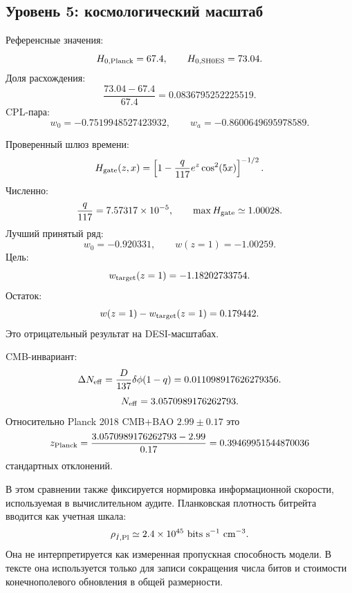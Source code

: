 \documentclass[11pt]{article}
\begin{document}
\subsection{Уровень 5: космологический масштаб}

Референсные значения:
\begin{equation}
    H_{0,\rm Planck}=67.4,
    \qquad
    H_{0,\rm SH0ES}=73.04.
\end{equation}
Доля расхождения:
\begin{equation}
    \frac{73.04-67.4}{67.4}=0.0836795252225519.
\end{equation}
CPL-пара:
\begin{equation}
    w_0=-0.7519948527423932,
    \qquad
    w_a=-0.8600649695978589.
\end{equation}

Проверенный шлюз времени:
\begin{equation}
    H_{\rm gate}(z,x)
    =
    \left[
        1-\frac{q}{117}e^z\cos^2(5x)
    \right]^{-1/2}.
\end{equation}
Численно:
\begin{equation}
    \frac{q}{117}=7.57317\times10^{-5},
    \qquad
    \max H_{\rm gate}\simeq1.00028.
\end{equation}
Лучший принятый ряд:
\begin{equation}
    w_0=-0.920331,\qquad w(z=1)=-1.00259.
\end{equation}
Цель:
\begin{equation}
    w_{\rm target}(z=1)=-1.18202733754.
\end{equation}
Остаток:
\begin{equation}
    w(z=1)-w_{\rm target}(z=1)=0.179442.
\end{equation}
Это отрицательный результат на DESI-масштабах.

CMB-инвариант:
\begin{equation}
    \Delta N_{\rm eff}
    =
    \frac{D}{137}\delta\phi(1-q)
    =
    0.011098917626279356.
\end{equation}
\begin{equation}
    N_{\rm eff}=3.0570989176262793.
\end{equation}
Относительно Planck 2018 CMB+BAO $2.99\pm0.17$ это
\begin{equation}
    z_{\rm Planck}
    =
    \frac{3.0570989176262793-2.99}{0.17}
    =
    0.39469951544870036
\end{equation}
стандартных отклонений.

В этом сравнении также фиксируется нормировка информационной скорости,
используемая в вычислительном аудите.  Планковская плотность битрейта вводится
как учетная шкала:
\begin{equation}
    \rho_{\dot I,{\rm Pl}}
    \simeq
    2.4\times10^{45}
    ~{\rm bits~s^{-1}~cm^{-3}}.
\end{equation}
Она не интерпретируется как измеренная пропускная способность модели.  В
тексте она используется только для записи сокращения числа битов и стоимости
конечнополевого обновления в общей размерности.
\end{document}
